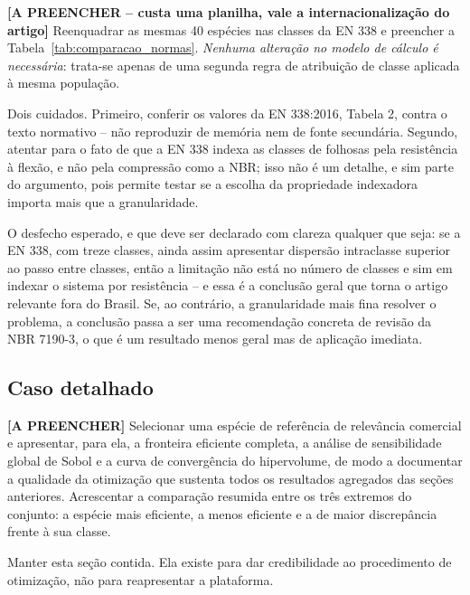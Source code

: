\begin{fillblock}
\noindent\textbf{[A PREENCHER -- custa uma planilha, vale a internacionalização do artigo]} Reenquadrar as mesmas 40 espécies nas classes da EN 338 e preencher a Tabela~\ref{tab:comparacao_normas}. \emph{Nenhuma alteração no modelo de cálculo é necessária}: trata-se apenas de uma segunda regra de atribuição de classe aplicada à mesma população.

Dois cuidados. Primeiro, conferir os valores da EN 338:2016, Tabela 2, contra o texto normativo -- não reproduzir de memória nem de fonte secundária. Segundo, atentar para o fato de que a EN 338 indexa as classes de folhosas pela resistência à flexão, e não pela compressão como a NBR; isso não é um detalhe, e sim parte do argumento, pois permite testar se a escolha da propriedade indexadora importa mais que a granularidade.

O desfecho esperado, e que deve ser declarado com clareza qualquer que seja: se a EN 338, com treze classes, ainda assim apresentar dispersão intraclasse superior ao passo entre classes, então a limitação não está no número de classes e sim em indexar o sistema por resistência -- e essa é a conclusão geral que torna o artigo relevante fora do Brasil. Se, ao contrário, a granularidade mais fina resolver o problema, a conclusão passa a ser uma recomendação concreta de revisão da NBR 7190-3, o que é um resultado menos geral mas de aplicação imediata.
\end{fillblock}

\subsection{Caso detalhado}\label{sec:caso_detalhado}

\begin{fillblock}
\noindent\textbf{[A PREENCHER]} Selecionar uma espécie de referência de relevância comercial e apresentar, para ela, a fronteira eficiente completa, a análise de sensibilidade global de Sobol e a curva de convergência do hipervolume, de modo a documentar a qualidade da otimização que sustenta todos os resultados agregados das seções anteriores. Acrescentar a comparação resumida entre os três extremos do conjunto: a espécie mais eficiente, a menos eficiente e a de maior discrepância frente à sua classe.

Manter esta seção contida. Ela existe para dar credibilidade ao procedimento de otimização, não para reapresentar a plataforma.
\end{fillblock}

